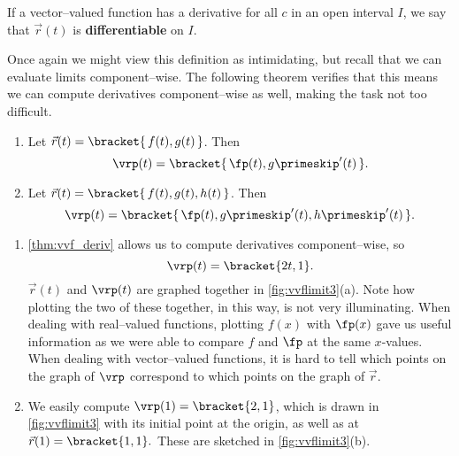 If a vector--valued function has a derivative for all $c$ in an open interval $I$, we say that $\vec r(t)$ is \textbf{differentiable} on $I$.

Once again we might view this definition as intimidating, but recall that we can evaluate limits component--wise. The following theorem verifies that this means we can compute derivatives component--wise as well, making the task not too difficult.

{\begin{enumerate}
	\item Let $\vec r(t) =\bracket{\, f(t), g(t)\,}$. Then 
	$$\vrp(t) =\bracket{\, \fp(t), g\primeskip'(t)\,}.$$
	\item Let $\vec r(t) =\bracket{\, f(t), g(t), h(t)\,}$. Then
	$$\vrp(t) =\bracket{\, \fp(t), g\primeskip'(t), h\primeskip'(t)\,}.$$
\end{enumerate}}


{\begin{enumerate}
\item	\autoref{thm:vvf_deriv} allows us to compute derivatives component--wise, so
\[\vrp(t) =\bracket{2t, 1}.\]
$\vec r(t)$ and $\vrp(t)$ are graphed together in \autoref{fig:vvflimit3}(a). Note how plotting the two of these together, in this way, is not very illuminating. When dealing with real--valued functions, plotting $f(x)$ with $\fp(x)$ gave us useful information as we were able to compare $f$ and $\fp$ at the same $x$-values. When dealing with vector--valued functions, it is hard to tell which points on the graph of $\vrp$ correspond to which points on the graph of $\vec r$.

\item	We easily compute $\vrp(1) =\bracket{2,1}$, which is drawn in \autoref{fig:vvflimit3} with its initial point at the origin, as well as at $\vec r(1) =\bracket{1,1}.$ These are sketched in \autoref{fig:vvflimit3}(b).\eoehere
\end{enumerate}}

